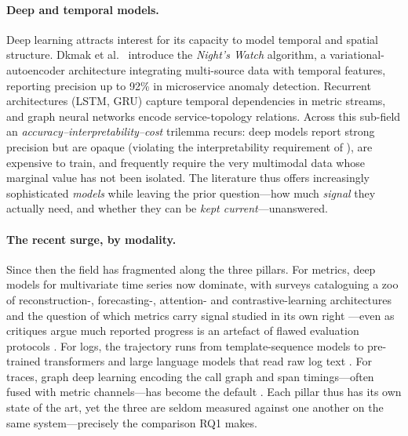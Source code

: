 \documentclass[pdflatex,sn-mathphys-num]{sn-jnl}%
\theoremstyle{thmstyleone}%
\theoremstyle{thmstyletwo}%
\theoremstyle{thmstylethree}%
\begin{document}
\paragraph{Deep and temporal models.} Deep learning attracts interest for its capacity to model temporal and spatial structure. Dkmak et al.\ \cite{dkmak2025} introduce the \emph{Night's Watch} algorithm, a variational-autoencoder architecture integrating multi-source data with temporal features, reporting precision up to 92\% in microservice anomaly detection. Recurrent architectures (LSTM, GRU) capture temporal dependencies in metric streams, and graph neural networks encode service-topology relations. Across this sub-field an \emph{accuracy--interpretability--cost} trilemma recurs: deep models report strong precision but are opaque (violating the interpretability requirement of \cite{raeiszadeh2026}), are expensive to train, and frequently require the very multimodal data whose marginal value has not been isolated. The literature thus offers increasingly sophisticated \emph{models} while leaving the prior question---how much \emph{signal} they actually need, and whether they can be \emph{kept current}---unanswered.

\paragraph{The recent surge, by modality.} Since then the field has fragmented along the three pillars. For metrics, deep models for multivariate time series now dominate, with surveys cataloguing a zoo of reconstruction-, forecasting-, attention- and contrastive-learning architectures \cite{wang2025mtssurvey,xia2024coupled,choi2024selfsup} and the question of which metrics carry signal studied in its own right \cite{singal2025metric}---even as critiques argue much reported progress is an artefact of flawed evaluation protocols \cite{sarfraz2024quovadis,wagner2025metrics}. For logs, the trajectory runs from template-sequence models to pre-trained transformers and large language models that read raw log text \cite{landauer2022logsurvey,guan2024logllm,pospieszny2025adalog}. For traces, graph deep learning encoding the call graph and span timings---often fused with metric channels---has become the default \cite{chen2023tracegra,akmeemana2025galmad,zhang2025graphneural,alomari2025context}. Each pillar thus has its own state of the art, yet the three are seldom measured against one another on the same system---precisely the comparison RQ1 makes.
\end{document}
